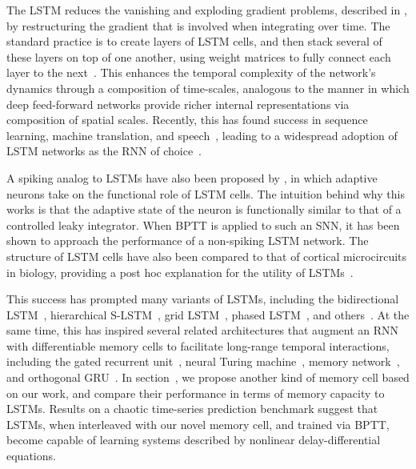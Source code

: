 The LSTM reduces the vanishing and exploding gradient problems, described in \citet{bengio1994learning}, by restructuring the gradient that is involved when integrating over time.
The standard practice is to create layers of LSTM cells, and then stack several of these layers on top of one another, using weight matrices to fully connect each layer to the next~\citep{graves2013speech}.
This enhances the temporal complexity of the network's dynamics through a composition of time-scales, analogous to the manner in which deep feed-forward networks provide richer internal representations via composition of spatial scales.
Recently, this has found success in sequence learning, machine translation, and speech~\citep{graves2013speech, sutskever2014sequence, cho2014learning, bahdanau2014neural}, leading to a widespread adoption of LSTM networks as the RNN of choice~\citep{lecun2015deep}.

A spiking analog to LSTMs have also been proposed by \citet{bellec2018long}, in which adaptive neurons take on the functional role of LSTM cells.
The intuition behind why this works is that the adaptive state of the neuron is functionally similar to that of a controlled leaky integrator.
When BPTT is applied to such an SNN, it has been shown to approach the performance of a non-spiking LSTM network.
The structure of LSTM cells have also been compared to that of cortical microcircuits in biology, providing a post hoc explanation for the utility of LSTMs~\citep{costa2017cortical}.

This success has prompted many variants of LSTMs, including the bidirectional LSTM~\citep{graves2005framewise}, hierarchical S-LSTM~\citep{zhu2015long}, grid LSTM~\citep{kalchbrenner2015grid}, phased LSTM~\citep{neil2016phased}, and others~\citep{salehinejad2017recent}.
At the same time, this has inspired several related architectures that augment an RNN with differentiable memory cells to facilitate long-range temporal interactions, including the gated recurrent unit~\citep[GRU;][]{cho2014properties, chung2014empirical}, neural Turing machine~\citep{graves2014neural}, memory network~\citep{weston2014memory}, and orthogonal GRU~\citep{jing2018gated}.
In section~, we propose another kind of memory cell based on our work, and compare their performance in terms of memory capacity to LSTMs.
Results on a chaotic time-series prediction benchmark suggest that LSTMs, when interleaved with our novel memory cell, and trained via BPTT, become capable of learning systems described by nonlinear delay-differential equations.

